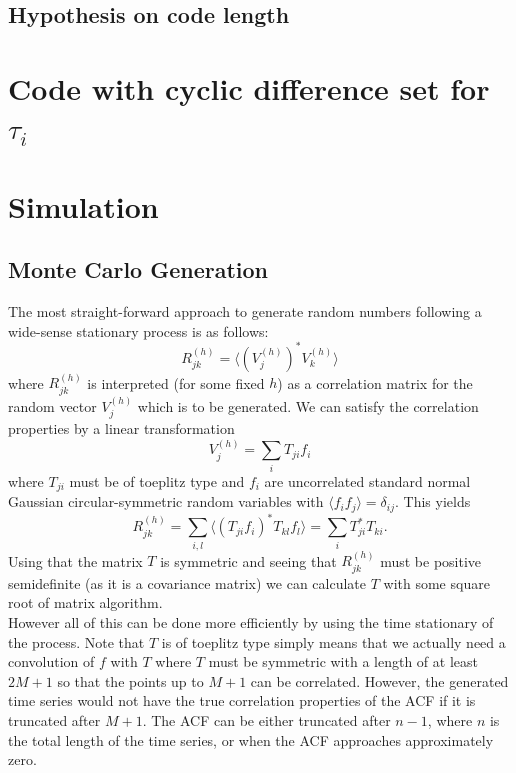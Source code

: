 \documentclass[18pt,a4paper]{extarticle}
\begin{document}
\subsection{Hypothesis on code length}
\section{Code with cyclic difference set for $\tau_i$}
\section{Simulation}
\subsection{Monte Carlo Generation}
The most straight-forward approach to generate random numbers following a wide-sense stationary process is as follows:
\begin{equation}
R^{(h)}_{jk} = \langle (V_{j}^{(h)})^* V_k^{(h)} \rangle
\end{equation}
where $R^{(h)}_{jk}$ is interpreted (for some fixed $h$) as a correlation matrix for the random vector $V_{j}^{(h)}$ which is to be generated.
We can satisfy the correlation properties by a linear transformation
\begin{equation}
V_j^{(h)} = \sum_{i} T_{ji}f_i
\end{equation}
where $T_{ji}$ must be of toeplitz type and $f_i$ are uncorrelated standard normal Gaussian circular-symmetric random variables with $\langle f_i f_j \rangle = \delta_{ij}$.
This yields
\begin{equation}
R^{(h)}_{jk} = \sum_{i,l} \langle (T_{ji}f_i)^* T_{kl}f_l \rangle = \sum_{i} T_{ji}^* T_{ki}.
\end{equation}
Using that the matrix $T$ is symmetric and seeing that $R^{(h)}_{jk}$ must be positive semidefinite (as it is a covariance matrix) we can calculate $T$ with some square root of matrix algorithm.\\
However all of this can be done more efficiently by using the time stationary of the process.
Note that $T$ is of toeplitz type simply means that we actually need a convolution of $f$ with $T$ where $T$ must be symmetric with a length of at least $2M + 1$ so that the points up to $M + 1$ can be correlated.
However, the generated time series would not have the true correlation properties of the ACF if it is truncated after $M+1$.
The ACF can be either truncated after $n-1$, where $n$ is the total length of the time series, or when the ACF approaches approximately zero.
\end{document}

